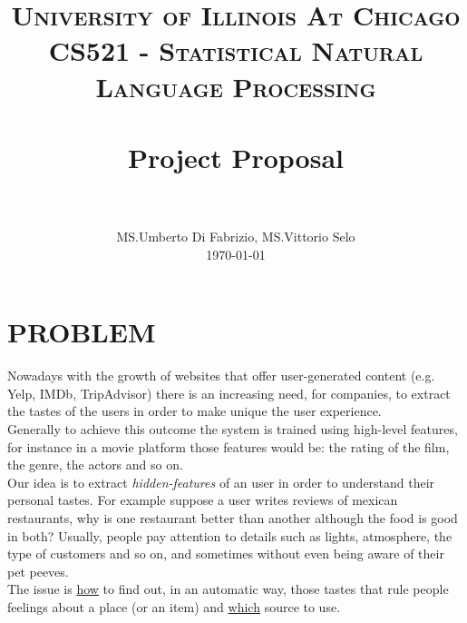 \documentclass[a4paper, 10pt, conference]{ieeeconf}      %
\title{
		\usefont{OT1}{bch}{b}{n}
		\normalfont \normalsize \textsc{University of Illinois At Chicago\\CS521 - Statistical Natural Language Processing} \\ [25pt]
		\horrule{2pt} \\[0.4cm]
		\huge Project Proposal \\
		\horrule{2pt} \\[0.3cm]
}
\author{
		\normalfont 								\large
         MS.Umberto Di Fabrizio, MS.Vittorio Selo\\		\normalsize
        \today \\[0.5cm]
}
\date{}
\begin{document}
\maketitle
\thispagestyle{empty}
\pagestyle{empty}

\section{PROBLEM}
Nowadays with the growth of websites that offer user-generated content (e.g. Yelp, IMDb, TripAdvisor) there is an increasing need, for companies, to extract the tastes of the users in order to make unique the user experience.\\
Generally to achieve this outcome the system is trained using high-level features, for instance in a movie platform those features would be: the rating of the film, the genre, the actors and so on.\\
Our idea is to extract \textit{hidden-features} of an user in order to understand their personal tastes.
 For example suppose a user writes reviews of mexican restaurants, why is one restaurant better than another although the food is good in both? Usually, people pay attention to details such as lights, atmosphere, the type of customers and so on, and sometimes without even being aware of their pet peeves.\\
The issue is \underline{how} to find out, in an automatic way, those tastes that rule people feelings about a place (or an item) and \underline{which} source to use.\\
\end{document}
